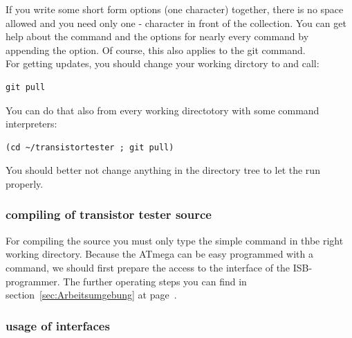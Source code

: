 If you write some short form options (one character) together, there is no space allowed
and you need only one - character in front of the collection.
You can get help about the command and the options for nearly every command by appending
the  option.
Of course, this also applies to the git command.\\
For getting updates, you should change your working dirctory to  and call:
\begin{large} \vspace{-0.4em} \begin{verbatim}
git pull
\end{verbatim} \end{large}
You can do that also from every working directotory with some command interpreters:
\begin{large} \vspace{-0.4em} \begin{verbatim}
(cd ~/transistortester ; git pull)
\end{verbatim} \end{large}
You should better not change anything in the 
directory tree to let the  run properly.


\subsubsection{compiling of transistor tester source}
For compiling the source you must only type the simple command 
in thbe right working directory.
Because the ATmega can be easy programmed with a  command,
we should first prepare the access to the interface of the ISB-programmer.
The further operating steps you can find in section~\ref{sec:Arbeitsumgebung}
at page~\pageref{sec:Arbeitsumgebung}.

\subsubsection{usage of interfaces}
\label{sec:Schnittstellen}


